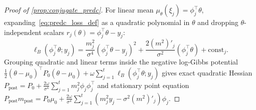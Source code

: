 \documentclass[11pt,a4paper,reqno]{amsart}
\theoremstyle{definition}
\theoremstyle{remark}
\begin{document}
\begin{proof}[Proof of \cref{prop:conjugate_predc}]
For linear mean $\mu_\theta(\xi_j) = \phi_j^\top \theta$, expanding~\eqref{eq:predc_loss_def} as a quadratic polynomial in $\theta$ and dropping $\theta$-independent scalars $r_j(\theta) = \phi_j^\top\theta - y_j$:
\[
\ell_B(\phi_j^\top\theta; y_j) = \frac{m_j^2}{\sigma^4}(\phi_j^\top\theta - y_j)^2 + \frac{2(m^2)'_j}{\sigma^2}(\phi_j^\top\theta) + \mathrm{const}_j.
\]
Grouping quadratic and linear terms inside the negative log-Gibbs potential $\frac{1}{2}(\theta-\mu_0)^\top P_0 (\theta-\mu_0) + \omega \sum_{j=1}^t \ell_B(\phi_j^\top\theta; y_j)$ gives exact quadratic Hessian $P_{\mathrm{post}} = P_0 + \frac{2\omega}{\sigma^4}\sum_{j=1}^t m_j^2 \phi_j \phi_j^\top$ and stationary point equation $P_{\mathrm{post}} m_{\mathrm{post}} = P_0\mu_0 + \frac{2\omega}{\sigma^4}\sum_{j=1}^t (m_j^2 y_j - \sigma^2 (m^2)'_j)\phi_j$.
\end{proof}
\end{document}

